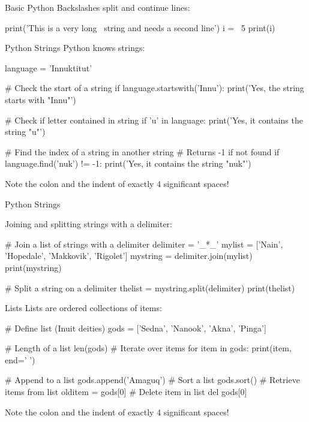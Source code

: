 \documentclass[ignorenonframetext,xcolor=x11names]{beamer}
\begin{document}
\begin{frame}[fragile]{Basic Python}
Backslashes split and continue lines:
\footnotesize
\begin{pythoncode}
print('This is a very long \
string and needs a second line')
i = \
5
print(i)
\end{pythoncode}
\end{frame}

\begin{frame}[fragile]{Python Strings}
Python knows strings:

\begin{pythoncode}
language = 'Innuktitut'

# Check the start of a string
if language.startswith('Innu'):
    print('Yes, the string starts with "Innu"')
    
# Check if letter contained in string
if 'u' in language:
    print('Yes, it contains the string "u"')
    
# Find the index of a string in another string
# Returns -1 if not found
if language.find('nuk') != -1:
    print('Yes, it contains the string "nuk"')
\end{pythoncode}

Note the colon and the indent of exactly 4 significant spaces!
\end{frame}

\begin{frame}[fragile]{Python Strings}

Joining and splitting strings with a delimiter:

\begin{pythoncode}
# Join a list of strings with a delimiter
delimiter = '_*_'
mylist = ['Nain', 'Hopedale', 'Makkovik', 'Rigolet']
mystring = delimiter.join(mylist)
print(mystring)

# Split a string on a delimiter
thelist = mystring.split(delimiter)
print(thelist)
\end{pythoncode}
\end{frame}

\begin{frame}[fragile]{Lists}
Lists are ordered collections of items:
\begin{pythoncode}
# Define list (Inuit deities)
gods = ['Sedna', 'Nanook', 'Akna', 'Pinga']

# Length of a list
len(gods)
# Iterate over items
for item in gods:
    print(item, end=' ')

# Append to a list
gods.append('Amaguq')
# Sort a list
gods.sort()
# Retrieve items from list
olditem = gods[0]
# Delete item in list
del gods[0]
\end{pythoncode}

Note the colon and the indent of exactly 4 significant spaces!

\end{frame}
\end{document}
